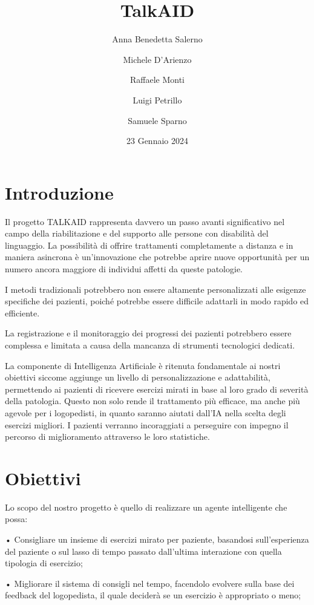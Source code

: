 \documentclass{article}
\title{TalkAID}
\author{
    Anna Benedetta Salerno\\
    \and
    Michele D'Arienzo\\
    \and
    Raffaele Monti\\
    \and
    Luigi Petrillo\\
    \and
    Samuele Sparno\\
}
\date{23 Gennaio 2024}
\begin{document}
    \maketitle

    \section{Introduzione}

    Il progetto TALKAID rappresenta davvero un passo avanti significativo nel campo della riabilitazione e del supporto alle persone con disabilità del linguaggio. La possibilità di offrire trattamenti completamente a distanza e in maniera asincrona è un'innovazione che potrebbe aprire nuove opportunità per un numero ancora maggiore di individui affetti da queste patologie.

    I metodi tradizionali potrebbero non essere altamente personalizzati alle esigenze specifiche dei pazienti, poiché potrebbe essere difficile adattarli in modo rapido ed efficiente.

    La registrazione e il monitoraggio dei progressi dei pazienti potrebbero essere complessa e limitata a causa della mancanza di strumenti tecnologici dedicati.

    La componente di Intelligenza Artificiale è ritenuta fondamentale ai nostri obiettivi siccome aggiunge un livello di personalizzazione e adattabilità, permettendo ai pazienti di ricevere esercizi mirati in base al loro grado di severità della patologia. Questo non solo rende il trattamento più efficace, ma anche più agevole per i logopedisti, in quanto saranno aiutati dall'IA nella scelta degli esercizi migliori. I pazienti verranno incoraggiati a perseguire con impegno il percorso di miglioramento attraverso le loro statistiche.

    \section{Obiettivi}

    Lo scopo del nostro progetto è quello di realizzare un agente intelligente che possa:

    • Consigliare un insieme di esercizi mirato per paziente, basandosi sull'esperienza del paziente o sul lasso di tempo passato dall'ultima interazione con quella tipologia di esercizio;

    • Migliorare il sistema di consigli nel tempo, facendolo evolvere sulla base dei feedback del logopedista, il quale deciderà se un esercizio è appropriato o meno;
\end{document}
